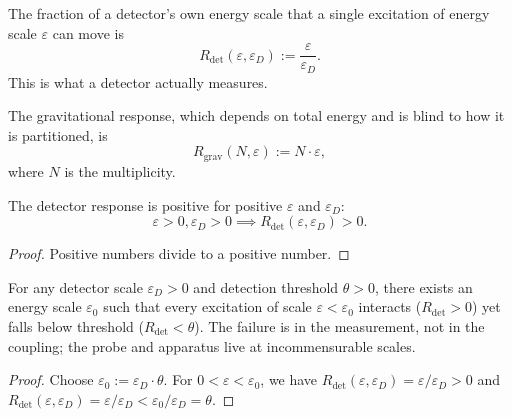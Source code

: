 \begin{definition}
The fraction of a detector's own energy scale that a single excitation of energy scale $\varepsilon$ can move is
\begin{equation}
R_{\text{det}}(\varepsilon, \varepsilon_D) := \frac{\varepsilon}{\varepsilon_D} .
\end{equation}
This is what a detector actually measures.
\end{definition}

\begin{definition}
The gravitational response, which depends on total energy and is blind to how it is partitioned, is
\begin{equation}
R_{\text{grav}}(N, \varepsilon) := N \cdot \varepsilon ,
\end{equation}
where $N$ is the multiplicity.
\end{definition}

\begin{theorem}
The detector response is positive for positive $\varepsilon$ and $\varepsilon_D$:
\begin{equation}
\varepsilon > 0, \varepsilon_D > 0 \implies R_{\text{det}}(\varepsilon, \varepsilon_D) > 0 .
\end{equation}
\end{theorem}

\begin{proof}
Positive numbers divide to a positive number.
\end{proof}

\begin{theorem}
For any detector scale $\varepsilon_D > 0$ and detection threshold $\theta > 0$, there exists an energy scale $\varepsilon_0$ such that every excitation of scale $\varepsilon < \varepsilon_0$ interacts ($R_{\text{det}} > 0$) yet falls below threshold ($R_{\text{det}} < \theta$). The failure is in the measurement, not in the coupling; the probe and apparatus live at incommensurable scales.
\end{theorem}

\begin{proof}
Choose $\varepsilon_0 := \varepsilon_D \cdot \theta$. For $0 < \varepsilon < \varepsilon_0$, we have $R_{\text{det}}(\varepsilon, \varepsilon_D) = \varepsilon/\varepsilon_D > 0$ and $R_{\text{det}}(\varepsilon, \varepsilon_D) = \varepsilon/\varepsilon_D < \varepsilon_0/\varepsilon_D = \theta$.
\end{proof}

